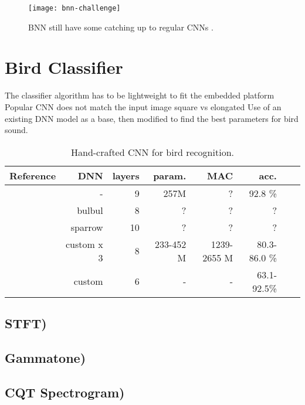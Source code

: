 \begin{figure}
    \centering
    \texttt{[image: bnn-challenge]}
    \caption{BNN still have some catching up to regular CNNs \citep{Rastegari2016}.}
    \label{bnn-challenge}
\end{figure}
\section{Bird Classifier}

 The classifier algorithm has to be lightweight to fit the embedded platform
 Popular CNN does not match the input image square vs elongated
 Use of an existing DNN model as a base, 
			then modified to find the best parameters for bird sound.

\begin{table} 
    \small
    \centering
    \caption{Hand-crafted CNN for bird recognition.}
    \begin{tabular}{lrrrrrrr}%
    \toprule
    \textbf{Reference} & 
    \textbf{DNN } &
    \textbf{layers} &
    \textbf{param.} &
    \textbf{MAC} &
    \textbf{acc.} \\
    \midrule
    \cite{Takahashi2016} & - & 9 & 257M & ? & 92.8 \% \\
    \cite{Grill2017} & bulbul & 8 & ? & ? & ?\\
    \cite{Grill2017} & sparrow & 10 &  ? & ? & ?\\
    \cite{Meyer2017} & custom x 3 & 8 & 233-452 M & 1239-2655 M & 80.3-86.0 \% \\
    \cite{Ruff2019} & custom & 6 & - & - & 63.1-92.5\% \\ %
    \bottomrule
    \end{tabular}
\end{table}

\subsection{STFT)}

\subsection{Gammatone)}

\subsection{CQT Spectrogram)}

